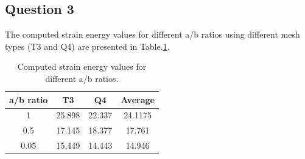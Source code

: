 \documentclass[twoside,twocolumn,10pt]{article}
\begin{document}






\subsection{Question 3}

The computed strain energy values for different a/b ratios using different mesh types (T3 and Q4) are presented in Table.\ref{tab:strain_energy_values}.

\begin{table}[h]
\centering
\caption{Computed strain energy values for different a/b ratios.}
\label{tab:strain_energy_values}
\begin{tabular}{cccc}
\toprule
a/b ratio & T3 & Q4 & Average \\
\midrule
1           & 25.898 & 22.337 & 24.1175 \\
0.5         & 17.145 & 18.377 & 17.761 \\
0.05        & 15.449 & 14.443 & 14.946 \\
\bottomrule
\end{tabular}
\end{table}
\end{document}
